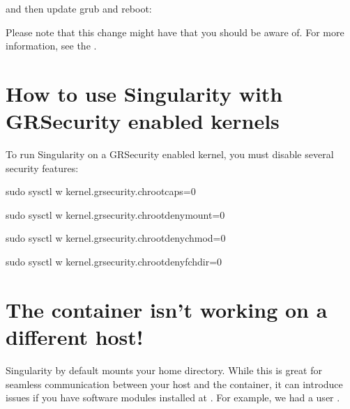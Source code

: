 \documentclass[letterpaper,10pt,english]{sphinxmanual}
\begin{document}
and then update grub and reboot:

%
\begin{sphinxVerbatim}[commandchars=\\\{\}]
  
\end{sphinxVerbatim}

Please note that this change might have  that
you should be aware of. For more information, see the .


\section{How to use Singularity with GRSecurity enabled kernels}
\label{\detokenize{troubleshooting:how-to-use-singularity-with-grsecurity-enabled-kernels}}
\begin{DUlineblock}{0em}
\item[] To run Singularity on a GRSecurity enabled kernel, you must disable
several security features:
\end{DUlineblock}

%
\begin{sphinxVerbatim}[commandchars=\\\{\}]
\PYGZdl{} sudo sysctl \PYGZhy{}w kernel.grsecurity.chroot\PYGZus{}caps=0

\PYGZdl{} sudo sysctl \PYGZhy{}w kernel.grsecurity.chroot\PYGZus{}deny\PYGZus{}mount=0

\PYGZdl{} sudo sysctl \PYGZhy{}w kernel.grsecurity.chroot\PYGZus{}deny\PYGZus{}chmod=0

\PYGZdl{} sudo sysctl \PYGZhy{}w kernel.grsecurity.chroot\PYGZus{}deny\PYGZus{}fchdir=0
\end{sphinxVerbatim}


\section{The container isn’t working on a different host!}
\label{\detokenize{troubleshooting:the-container-isnt-working-on-a-different-host}}
Singularity by default mounts your home directory. While this is great
for seamless communication between your host and the container, it can
introduce issues if you have software modules installed at . For
example, we had a user .
\end{document}
